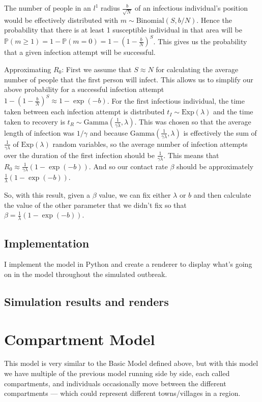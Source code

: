\documentclass[11pt]{article}
\begin{document}
The number of people in an $l^1$ radius $\frac{b}{\sqrt{N}}$ of an infectious individual's position would be effectively distributed with $m\sim \text{Binomial}(S,b/N)$. Hence the probability that there is at least 1 susceptible individual in that area will be $\mathbb{P}(m\geq 1) = 1-\mathbb{P}(m=0) = 1-(1-\frac{b}{N})^S$. This gives us the probability that a given infection attempt will be successful.

Approximating $R_0$: First we assume that $S\approx N$ for calculating the average number of people that the first person will infect. This allows us to simplify our above probability for a successful infection attempt $1-(1-\frac{b}{N})^S\approx 1-\exp(-b)$. For the first infectious individual, the time taken between each infection attempt is distributed $t_I\sim \text{Exp}(\lambda)$ and the time taken to recovery is $t_R \sim \text{Gamma}(\frac{1}{\gamma\lambda}, \lambda)$. This was chosen so that the average length of infection was $1/\gamma$ and because $\text{Gamma}(\frac{1}{\gamma\lambda}, \lambda)$ is effectively the sum of $\frac{1}{\gamma\lambda}$ of $\text{Exp}(\lambda)$ random variables, so the average number of infection attempts over the duration of the first infection should be $\frac{1}{\gamma\lambda}$. This means that $R_0\approx\frac{1}{\gamma\lambda}(1-\exp(-b))$. And so our contact rate $\beta$ should be approximately $\frac{1}{\lambda}(1-\exp(-b))$.

So, with this result, given a $\beta$ value, we can fix either $\lambda$ or $b$ and then calculate the value of the other parameter that we didn't fix so that $\beta = \frac{1}{\lambda}(1-\exp(-b))$.

\subsection*{Implementation}
I implement the model in Python and create a renderer to display what's going on in the model throughout the simulated outbreak.

\subsection*{Simulation results and renders}


\section*{Compartment Model}
This model is very similar to the Basic Model defined above, but with this model we have multiple of the previous model running side by side, each called compartments, and individuals occasionally move between the different compartments — which could represent different towns/villages in a region.
\end{document}
